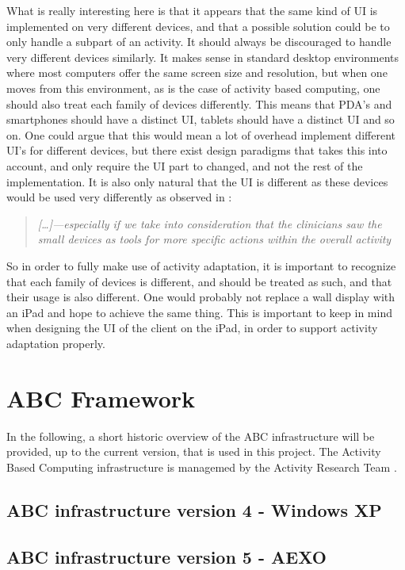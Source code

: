 What is really interesting here is that it appears that the same kind of UI is implemented on very different devices, and that a possible solution could be to only handle a subpart of an activity. It should always be discouraged to handle very different devices similarly. It makes sense in standard desktop environments where most computers offer the same screen size and resolution, but when one moves from this environment, as is the case of activity based computing, one should also treat each family of devices differently. This means that PDA's and smartphones should have a distinct UI, tablets should have a distinct UI and so on. One could argue that this would mean a lot of overhead implement different UI's for different devices, but there exist design paradigms that takes this into account, and only require the UI part to changed, and not the rest of the implementation. It is also only natural that the UI is different as these devices would be used very differently as observed in \citet{bardram2009}:

\begin{quotation}
	\emph{
		[\ldots]—especially if we take into consideration that the clinicians saw the small devices as tools for more specific actions within the overall activity
	} 
\end{quotation}

So in order to fully make use of activity adaptation, it is important to recognize that each family of devices is different, and should be treated as such, and that their usage is also different. One would probably not replace a wall display with an iPad and hope to achieve the same thing. This is important to keep in mind when designing the UI of the client on the iPad, in order to support activity adaptation properly.

\section{ABC Framework}
In the following, a short historic overview of the ABC infrastructure will be provided, up to the current version, that is used in this project. The Activity Based Computing infrastructure is managemed by the Activity Research Team \citep{team2012}.

\subsection{ABC infrastructure version 4 - Windows XP}

\subsection{ABC infrastructure version 5 - AEXO}


